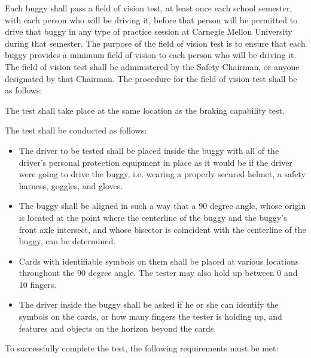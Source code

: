 	Each buggy shall pass a field of vision test, at least once each school
	semester, with each person who will be driving it, before that person will be
	permitted to drive that buggy in any type of practice session at Carnegie
	Mellon University during that semester. The purpose of the field of vision test
	is to ensure that each buggy provides a minimum field of vision to each person
	who will be driving it. The field of vision test shall be administered by the
	Safety Chairman, or anyone designated by that Chairman. The procedure for the
	field of vision test shall be as follows:
	\newline

	\noindent The test shall take place at the same location as the braking capability test.
	\newline

	\noindent The test shall be conducted as follows:

	\begin{itemize}

		\item
		The driver to be tested shall be placed inside the buggy with all of the
		driver's personal protection equipment in place as it would be if the driver
		were going to drive the buggy, i.e. wearing a properly secured helmet, a safety
		harness, goggles, and gloves.

		\item
		The buggy shall be aligned in such a way that a 90 degree angle, whose origin
		is located at the point where the centerline of the buggy and the buggy's front
		axle intersect, and whose bisector is coincident with the centerline of the
		buggy, can be determined.

		\item
		Cards with identifiable symbols on them shall be placed at various locations
		throughout the 90 degree angle. The tester may also hold up between 0 and 10
		fingers.

		\item
		The driver inside the buggy shall be asked if he or she can identify the
		symbols on the cards, or how many fingers the tester is holding up, and
		features and objects on the horizon beyond the cards.

	\end{itemize}

	\noindent To successfully complete the test, the following requirements must be met:

